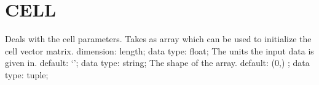 \section{CELL}
\label{CELL}
\begin{ipifield}{}%
{Deals with the cell parameters. Takes as array which can be used to initialize the cell vector matrix.}%
{dimension: length; data type: float; }%
{%
{The units the input data is given in.}%
{default: `'; data type: string; }%
%
{The shape of the array.}%
{default:  (0,) ; data type: tuple; }%
}
\end{ipifield}
